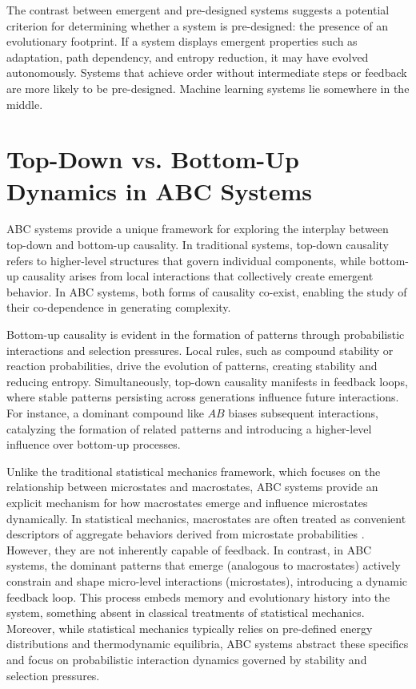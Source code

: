 \documentclass[entropy,article,submit,pdftex,moreauthors]{Definitions/mdpi}
\begin{document}
The contrast between emergent and pre-designed systems suggests a potential criterion for determining whether a system is pre-designed: the presence of an evolutionary footprint. If a system displays emergent properties such as adaptation, path dependency, and entropy reduction, it may have evolved autonomously. Systems that achieve order without intermediate steps or feedback are more likely to be pre-designed. Machine learning systems lie somewhere in the middle.


\section{Top-Down vs. Bottom-Up Dynamics in ABC Systems}

ABC systems provide a unique framework for exploring the interplay between top-down and bottom-up causality. In traditional systems, top-down causality refers to higher-level structures that govern individual components, while bottom-up causality arises from local interactions that collectively create emergent behavior. In ABC systems, both forms of causality co-exist, enabling the study of their co-dependence in generating complexity.

Bottom-up causality is evident in the formation of patterns through probabilistic interactions and selection pressures. Local rules, such as compound stability or reaction probabilities, drive the evolution of patterns, creating stability and reducing entropy. Simultaneously, top-down causality manifests in feedback loops, where stable patterns persisting across generations influence future interactions. For instance, a dominant compound like \( AB \) biases subsequent interactions, catalyzing the formation of related patterns and introducing a higher-level influence over bottom-up processes.

Unlike the traditional statistical mechanics framework, which focuses on the relationship between microstates and macrostates, ABC systems provide an explicit mechanism for how macrostates emerge and influence microstates dynamically. In statistical mechanics, macrostates are often treated as convenient descriptors of aggregate behaviors derived from microstate probabilities \cite{landau1980statistical}. However, they are not inherently capable of feedback. In contrast, in ABC systems, the dominant patterns that emerge (analogous to macrostates) actively constrain and shape micro-level interactions (microstates), introducing a dynamic feedback loop. This process embeds memory and evolutionary history into the system, something absent in classical treatments of statistical mechanics. Moreover, while statistical mechanics typically relies on pre-defined energy distributions and thermodynamic equilibria, ABC systems abstract these specifics and focus on probabilistic interaction dynamics governed by stability and selection pressures.
\end{document}
